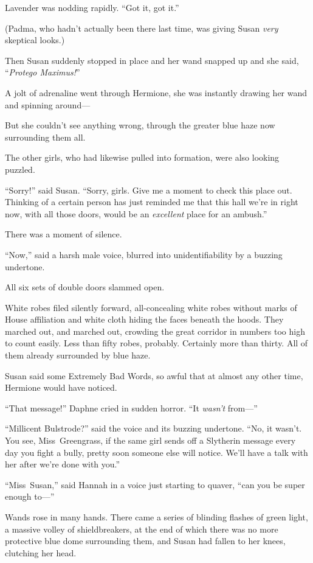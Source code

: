 Lavender was nodding rapidly. “Got it, got it.”

(Padma, who hadn’t actually been there last time, was giving Susan \emph{very} skeptical looks.)

Then Susan suddenly stopped in place and her wand snapped up and she said, “\emph{Protego Maximus!}”

A jolt of adrenaline went through Hermione, she was instantly drawing her wand and spinning around—

But she couldn’t see anything wrong, through the greater blue haze now surrounding them all.

The other girls, who had likewise pulled into formation, were also looking puzzled.

“Sorry!” said Susan. “Sorry, girls. Give me a moment to check this place out. Thinking of a certain person has just reminded me that this hall we’re in right now, with all those doors, would be an \emph{excellent} place for an ambush.”

There was a moment of silence.

“Now,” said a harsh male voice, blurred into unidentifiability by a buzzing undertone.

All six sets of double doors slammed open.

White robes filed silently forward, all-concealing white robes without marks of House affiliation and white cloth hiding the faces beneath the hoods. They marched out, and marched out, crowding the great corridor in numbers too high to count easily. Less than fifty robes, probably. Certainly more than thirty. All of them already surrounded by blue haze.

Susan said some Extremely Bad Words, so awful that at almost any other time, Hermione would have noticed.

“That message!” Daphne cried in sudden horror. “It \emph{wasn’t} from—”

“Millicent Bulstrode?” said the voice and its buzzing undertone. “No, it wasn’t. You see, Miss~Greengrass, if the same girl sends off a Slytherin message every day you fight a bully, pretty soon someone else will notice. We’ll have a talk with her after we’re done with you.”

“Miss~Susan,” said Hannah in a voice just starting to quaver, “can you be super enough to—”

Wands rose in many hands. There came a series of blinding flashes of green light, a massive volley of shieldbreakers, at the end of which there was no more protective blue dome surrounding them, and Susan had fallen to her knees, clutching her head.

